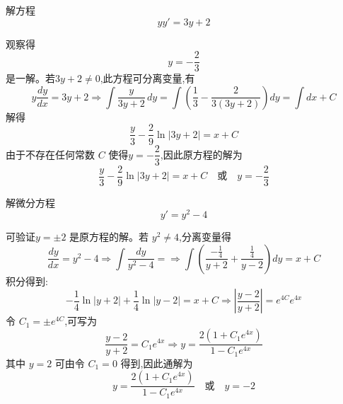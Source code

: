 \begin{questions}
    \question 解方程 
    \[
    yy' = 3y + 2
    \]
    \begin{solution}
        观察得
        \[
        y = -\frac{2}{3}
        \]
        是一解。若$3y+2 \neq 0$,此方程可分离变量,有
        \[
        y\frac{dy}{dx} = 3y + 2 \Rightarrow \int \frac{y}{3y+2}\,dy = \int \left(\frac{1}{3} - \frac{2}{3(3y+2)}\right) dy = \int dx + C
        \]
        解得
        \[
        \frac{y}{3} - \frac{2}{9}\ln |3y+2| = x + C
        \]
        由于不存在任何常数 $C$ 使得$y = -\dfrac{2}{3}$,因此原方程的解为
        \[
        \frac{y}{3} - \frac{2}{9}\ln |3y+2| = x + C \quad \text{或} \quad
        y = -\frac{2}{3}
        \]
    \end{solution}

    \question 解微分方程 
    \[
    y' = y^{2}-4
    \]
    \begin{solution}
        可验证$y = \pm2$ 是原方程的解。若 $y^{2} \neq 4$,分离变量得
        \[
        \frac{dy}{dx} = y^{2}-4 \Rightarrow \int \frac{dy}{y^{2}-4} = \Rightarrow \int \left( \frac{-\frac{1}{4}}{y+2} + \frac{\frac{1}{4}}{y-2} \right) dy = x + C
        \]
        积分得到:
        \[
        -\frac{1}{4} \ln |y+2| + \frac{1}{4} \ln |y-2| = x + C \Rightarrow \left| \frac{y-2}{y+2} \right| = e^{4C} e^{4x}
        \]
        令 $ C_1 = \pm e^{4C} $,可写为
        \[
        \frac{y-2}{y+2} = C_1 e^{4x} \Rightarrow y = \frac{2(1 + C_1 e^{4x})}{1 - C_1 e^{4x}}
        \]
        其中 $y = 2$ 可由令 $C_1 = 0$ 得到,因此通解为
        \[
        y = \frac{2(1 + C_1 e^{4x})}{1 - C_1 e^{4x}} \quad \text{或} \quad y = -2
        \]
    \end{solution}


\end{questions}
